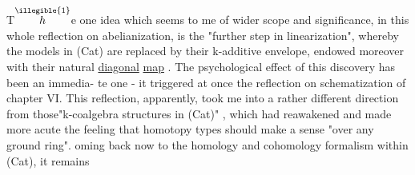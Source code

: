 T$\overset{\illegible{1}}{h}$e  one idea which seems to me of wider scope and significance,
in this whole reflection on abelianization,  is the "further step in
linearization",  whereby the models in (Cat) are replaced by their
k-additive envelope,  endowed moreover with their natural \uline{diagonal}
\uline{map}  .  The psychological effect of this discovery has been an immedia-%
te one  -   it triggered at once the reflection on schematization
of chapter VI.  This reflection,  apparently,  took me into a rather
different direction from those\hand{$\vert$}"k-coalgebra structures in (Cat)" ,
which had reawakened and made more acute the feeling that homotopy
types should make a sense "over any ground ring".  oming back now to
the homology and cohomology formalism within (Cat),  it remains 


